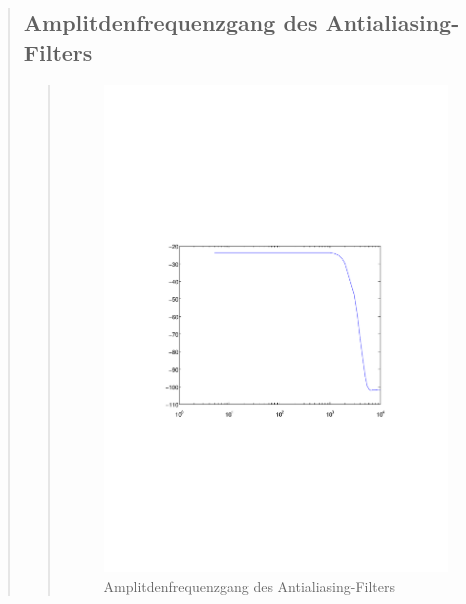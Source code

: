 \begin{quote}
\begin{quote}
    \end{quote}


    
    \subsection{Amplitdenfrequenzgang des Antialiasing-Filters}
    \begin{quote}
        
        \begin{figure}[H]
        \centering
            \includegraphics[scale=0.9, trim = 30mm 90mm 30mm 90mm, clip]{Bilder/realer_filter}
                \caption{Amplitdenfrequenzgang des Antialiasing-Filters}
                \label{fig:Rauschen}
        \end{figure}
        

\end{quote}
\end{quote}
